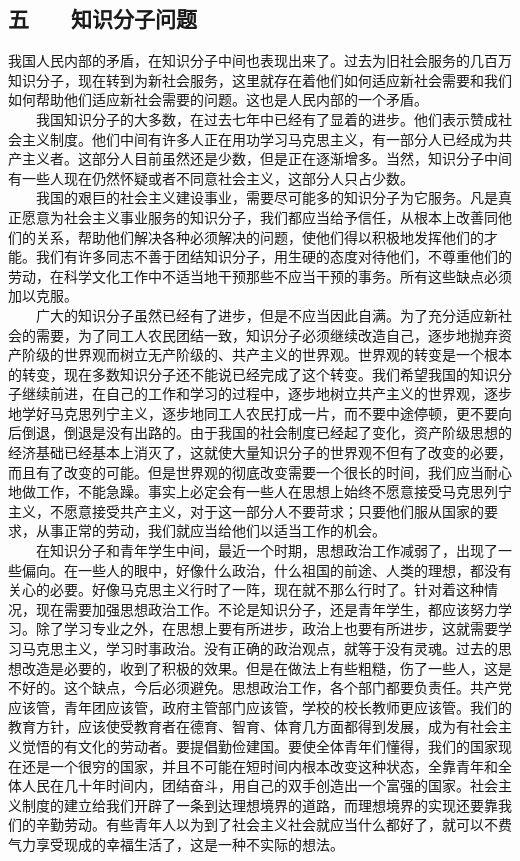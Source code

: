 \documentclass[cn,11pt,chinese]{elegantbook}
\def\myformat#1{\hfil\hfil #1}
\begin{document}
\subsection*{\myformat{五　　知识分子问题}}
我国人民内部的矛盾，在知识分子中间也表现出来了。过去为旧社会服务的几百万知识分子，现在转到为新社会服务，这里就存在着他们如何适应新社会需要和我们如何帮助他们适应新社会需要的问题。这也是人民内部的一个矛盾。\\
　　我国知识分子的大多数，在过去七年中已经有了显着的进步。他们表示赞成社会主义制度。他们中间有许多人正在用功学习马克思主义，有一部分人已经成为共产主义者。这部分人目前虽然还是少数，但是正在逐渐增多。当然，知识分子中间有一些人现在仍然怀疑或者不同意社会主义，这部分人只占少数。\\
　　我国的艰巨的社会主义建设事业，需要尽可能多的知识分子为它服务。凡是真正愿意为社会主义事业服务的知识分子，我们都应当给予信任，从根本上改善同他们的关系，帮助他们解决各种必须解决的问题，使他们得以积极地发挥他们的才能。我们有许多同志不善于团结知识分子，用生硬的态度对待他们，不尊重他们的劳动，在科学文化工作中不适当地干预那些不应当干预的事务。所有这些缺点必须加以克服。\\
　　广大的知识分子虽然已经有了进步，但是不应当因此自满。为了充分适应新社会的需要，为了同工人农民团结一致，知识分子必须继续改造自己，逐步地抛弃资产阶级的世界观而树立无产阶级的、共产主义的世界观。世界观的转变是一个根本的转变，现在多数知识分子还不能说已经完成了这个转变。我们希望我国的知识分子继续前进，在自己的工作和学习的过程中，逐步地树立共产主义的世界观，逐步地学好马克思列宁主义，逐步地同工人农民打成一片，而不要中途停顿，更不要向后倒退，倒退是没有出路的。由于我国的社会制度已经起了变化，资产阶级思想的经济基础已经基本上消灭了，这就使大量知识分子的世界观不但有了改变的必要，而且有了改变的可能。但是世界观的彻底改变需要一个很长的时间，我们应当耐心地做工作，不能急躁。事实上必定会有一些人在思想上始终不愿意接受马克思列宁主义，不愿意接受共产主义，对于这一部分人不要苛求；只要他们服从国家的要求，从事正常的劳动，我们就应当给他们以适当工作的机会。\\
　　在知识分子和青年学生中间，最近一个时期，思想政治工作减弱了，出现了一些偏向。在一些人的眼中，好像什么政治，什么祖国的前途、人类的理想，都没有关心的必要。好像马克思主义行时了一阵，现在就不那么行时了。针对着这种情况，现在需要加强思想政治工作。不论是知识分子，还是青年学生，都应该努力学习。除了学习专业之外，在思想上要有所进步，政治上也要有所进步，这就需要学习马克思主义，学习时事政治。没有正确的政治观点，就等于没有灵魂。过去的思想改造是必要的，收到了积极的效果。但是在做法上有些粗糙，伤了一些人，这是不好的。这个缺点，今后必须避免。思想政治工作，各个部门都要负责任。共产党应该管，青年团应该管，政府主管部门应该管，学校的校长教师更应该管。我们的教育方针，应该使受教育者在德育、智育、体育几方面都得到发展，成为有社会主义觉悟的有文化的劳动者。要提倡勤俭建国。要使全体青年们懂得，我们的国家现在还是一个很穷的国家，并且不可能在短时间内根本改变这种状态，全靠青年和全体人民在几十年时间内，团结奋斗，用自己的双手创造出一个富强的国家。社会主义制度的建立给我们开辟了一条到达理想境界的道路，而理想境界的实现还要靠我们的辛勤劳动。有些青年人以为到了社会主义社会就应当什么都好了，就可以不费气力享受现成的幸福生活了，这是一种不实际的想法。\\
\end{document}
